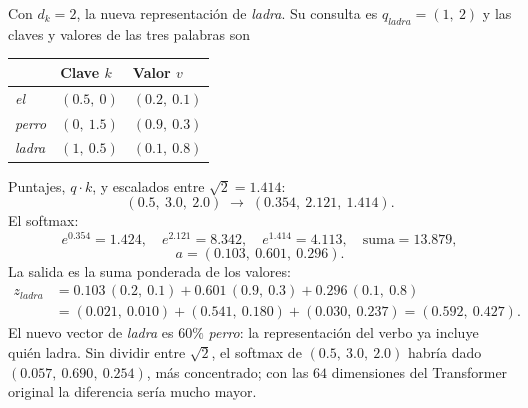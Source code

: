 \documentclass[11pt,letterpaper]{article}
\begin{document}
\begin{ejemplo}
    Con $d_k = 2$, la nueva representación de \textit{ladra}. Su
    consulta es $q_{\textit{ladra}} = (1,\ 2)$ y las claves y valores
    de las tres palabras son
    \begin{center}
    \begin{tabular}{lll}
        \toprule
        & \textbf{Clave} $k$ & \textbf{Valor} $v$ \\
        \midrule
        \textit{el}    & $(0.5,\ 0)$   & $(0.2,\ 0.1)$ \\
        \textit{perro} & $(0,\ 1.5)$   & $(0.9,\ 0.3)$ \\
        \textit{ladra} & $(1,\ 0.5)$   & $(0.1,\ 0.8)$ \\
        \bottomrule
    \end{tabular}
    \end{center}
    Puntajes, $q \cdot k$, y escalados entre $\sqrt{2} = 1.414$:
    \[
        (0.5,\ 3.0,\ 2.0) \;\longrightarrow\;
        (0.354,\ 2.121,\ 1.414) .
    \]
    El softmax:
    \[
        e^{0.354} = 1.424 , \quad e^{2.121} = 8.342 , \quad
        e^{1.414} = 4.113 , \quad \text{suma} = 13.879 ,
    \]
    \[
        a = (0.103,\ 0.601,\ 0.296) .
    \]
    La salida es la suma ponderada de los valores:
    \begin{align*}
        z_{\textit{ladra}}
          &= 0.103\,(0.2,\ 0.1) + 0.601\,(0.9,\ 0.3)
             + 0.296\,(0.1,\ 0.8) \\
          &= (0.021,\ 0.010) + (0.541,\ 0.180) + (0.030,\ 0.237)
           = (0.592,\ 0.427) .
    \end{align*}
    El nuevo vector de \textit{ladra} es $60\%$ \textit{perro}: la
    representación del verbo ya incluye quién ladra. Sin dividir entre
    $\sqrt{2}$, el softmax de $(0.5,\ 3.0,\ 2.0)$ habría dado
    $(0.057,\ 0.690,\ 0.254)$, más concentrado; con las $64$
    dimensiones del Transformer original la diferencia sería mucho
    mayor.
\end{ejemplo}

\begin{center}
\end{center}
\end{document}

